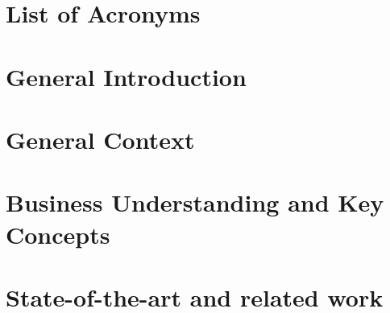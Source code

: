 \documentclass[12pt]{report}
\begin{document}





\chapter*{List of Acronyms}


\listoffigures
\newpage
{} %
\listoftables


\newpage


\chapter*{General Introduction}

\setcounter{chapter}{0}  %
\setcounter{section}{0}
\chapter{General Context}


\newpage

\setcounter{chapter}{1}  %
\setcounter{section}{0}
\chapter{Business Understanding and Key Concepts}





\newpage

\setcounter{chapter}{2}
\setcounter{section}{0}
\chapter{State-of-the-art and related work}

\end{document}

